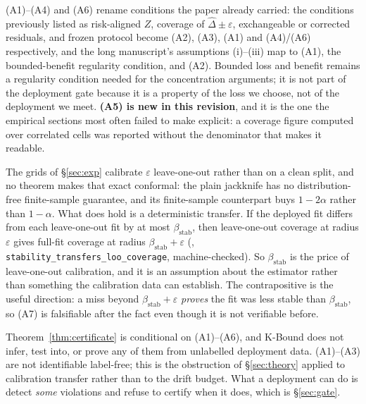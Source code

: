\noindent (A1)--(A4) and (A6) rename conditions the paper already carried:
the conditions previously listed as risk-aligned $Z$, coverage of
$\widehat\Delta\pm\varepsilon$, exchangeable or corrected residuals, and frozen
protocol become (A2), (A3), (A1) and (A4)/(A6) respectively, and the long manuscript's assumptions (i)--(iii) map to (A1), the
bounded-benefit regularity condition, and (A2). Bounded loss and benefit remains a
regularity condition needed for the concentration arguments; it is not part of the
deployment gate because it is a property of the loss we choose, not of the deployment we
meet. \textbf{(A5) is new in this revision}, and it is the one the empirical sections
most often failed to make explicit: a coverage figure computed over correlated cells was
reported without the denominator that makes it readable.

\begin{remark}\label{rem:a7}
The grids of \S\ref{sec:exp} calibrate $\varepsilon$ leave-one-out rather than on a
clean split, and no theorem makes that exact conformal: the plain jackknife has no
distribution-free finite-sample guarantee, and its finite-sample counterpart buys
$1-2\alpha$ rather than $1-\alpha$. What does hold is a deterministic transfer. If the
deployed fit differs from each leave-one-out fit by at most $\beta_{\mathrm{stab}}$,
then leave-one-out coverage at radius $\varepsilon$ gives full-fit coverage at radius
$\beta_{\mathrm{stab}}+\varepsilon$ (,
\texttt{stability\_transfers\_loo\_coverage}, machine-checked). So
$\beta_{\mathrm{stab}}$ is the price of leave-one-out calibration, and it is an
assumption about the estimator rather than something the calibration data can
establish. The contrapositive is the useful direction: a miss beyond
$\beta_{\mathrm{stab}}+\varepsilon$ \emph{proves} the fit was less stable than
$\beta_{\mathrm{stab}}$, so (A7) is falsifiable after the fact even though it is not
verifiable before.
\end{remark}

\begin{remark}\label{rem:contract-not}
Theorem~\ref{thm:certificate} is conditional on (A1)--(A6), and K-Bound does not infer,
test into, or prove any of them from unlabelled deployment data. (A1)--(A3) are not
identifiable label-free; this is the obstruction of \S\ref{sec:theory} applied to
calibration transfer rather than to the drift budget. What a deployment can do is detect
\emph{some} violations and refuse to certify when it does, which is \S\ref{sec:gate}.
\end{remark}


